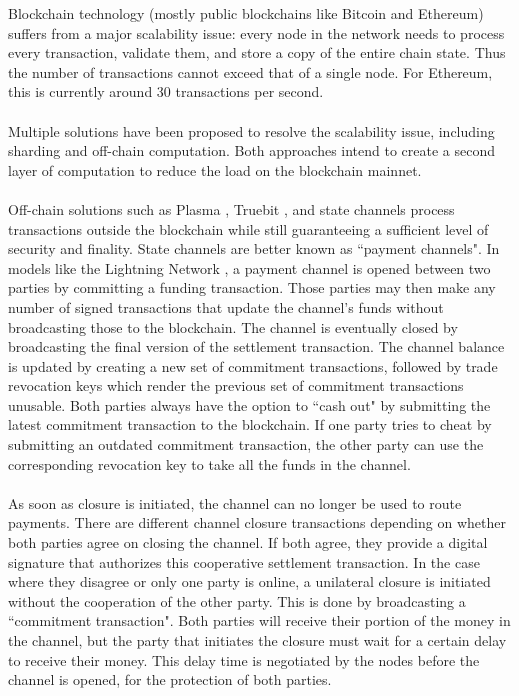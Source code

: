 Blockchain technology (mostly public blockchains like Bitcoin and Ethereum) suffers from a major scalability issue: every node in the network needs to process every transaction, validate them, and store a copy of the entire chain state. Thus the number of transactions cannot exceed that of a single node. For Ethereum, this is currently around 30 transactions per second.
\\~\\Multiple solutions have been proposed to resolve the scalability issue, including sharding and off-chain computation. Both approaches intend to create a second layer of computation to reduce the load on the blockchain mainnet.
\\~\\Off-chain solutions such as Plasma \cite{plasma}, Truebit \cite{truebit}, and state channels process transactions outside the blockchain while still guaranteeing a sufficient level of security and finality. State channels are better known as ``payment channels". In models like the Lightning Network \cite{lightningnetwork}, a payment channel is opened between two parties by committing a funding transaction. Those parties may then make any number of signed transactions that update the channel's funds without broadcasting those to the blockchain. The channel is eventually closed by broadcasting the final version of the settlement transaction.
The channel balance is updated by creating a new set of commitment transactions, followed by trade revocation keys which render the previous set of commitment transactions unusable. Both parties always have the option to ``cash out" by submitting the latest commitment transaction to the blockchain. If one party tries to cheat by submitting an outdated commitment transaction, the other party can use the corresponding revocation key to take all the funds in the channel.
\\~\\As soon as closure is initiated, the channel can no longer be used to route payments. There are different channel closure transactions depending on whether both parties agree on closing the channel. If both agree, they provide a digital signature that authorizes this cooperative settlement transaction. In the case where they disagree or only one party is online, a unilateral closure is initiated without the cooperation of the other party. This is done by broadcasting a ``commitment transaction". Both parties will receive their portion of the money in the channel, but the party that initiates the closure must wait for a certain delay to receive their money. This delay time is negotiated by the nodes before the channel is opened, for the protection of both parties.
